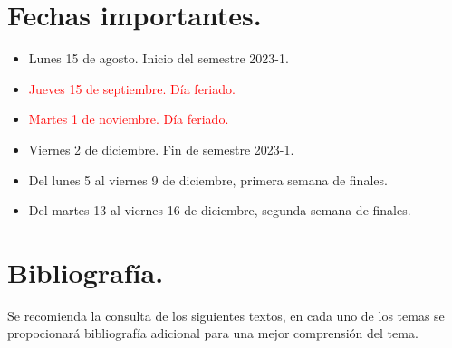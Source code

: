 \section{Fechas importantes.}

\begin{itemize}
\item Lunes 15 de agosto. Inicio del semestre 2023-1.
\item \textcolor{red}{Jueves 15 de septiembre. Día feriado.}
\item \textcolor{red}{Martes 1 de noviembre. Día feriado.}
\item Viernes 2 de diciembre. Fin de semestre 2023-1.
\item Del lunes 5 al viernes 9 de diciembre, primera semana de finales.
\item Del martes 13 al viernes 16 de diciembre, segunda semana de finales.
\end{itemize}

\section{Bibliografía.}

Se recomienda la consulta de los siguientes textos, en cada uno de los temas se propocionará bibliografía adicional para una mejor comprensión del tema.
\nocite{*}


